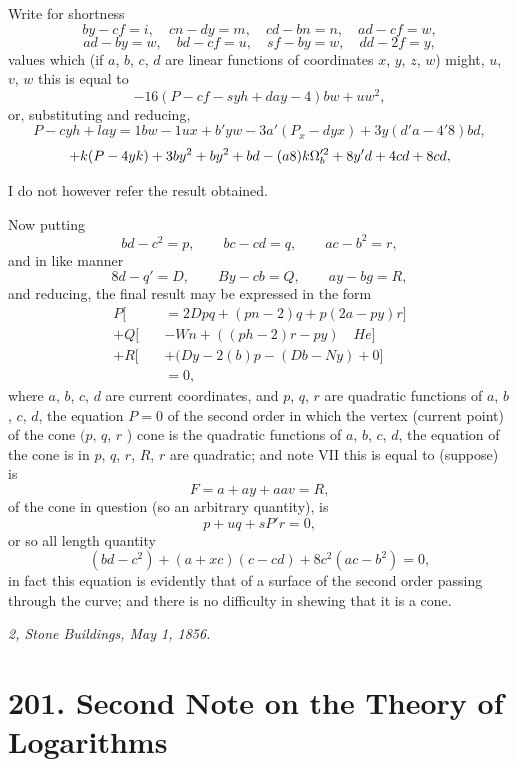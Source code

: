 \documentclass[12pt,a4paper]{article}
\theoremstyle{definition}
\begin{document}
Write for shortness
\[
by - cf = i, \quad cn - dy = m, \quad cd - bn = n, \quad ad - cf = w,
\]
\[
ad - by = w, \quad bd - cf = u, \quad sf - by = w, \quad dd - 2f = y,
\]
values which (if $a$, $b$, $c$, $d$ are linear functions of coordinates $x$, $y$, $z$, $w$) might, $u$, $v$, $w$
this is equal to
\[
-16(P - cf - syh + day - 4)bw + uw^2,
\]
or, substituting and reducing,
\[
P - cy h + lay = 1bw - 1ux + b'y w - 3a'(P_x - dy x) + 3y(d'a - 4'8) bd,
\]
\[
+ k(P - 4y k) + 3by^2 + by^2 + bd\\
- (a8) k\Omega_b'^2 + 8y'd + 4cd + 8cd,
\]

I do not however refer the result obtained.

\medskip

Now putting
\[
bd - c^2 = p,\qquad bc - cd = q,\qquad ac - b^2 = r,
\]
and in like manner
\[
8d - q' = D,\qquad By - cb = Q,\qquad ay - bg = R,
\]
and reducing, the final result may be expressed in the form
\begin{align*}
P[\quad &= 2Dpq + (pn - 2)q + p(2a - py)r]\\
+ Q[\quad &-Wn + ((ph - 2)r - py)\quad He]\\
+ R[\quad & + (Dy - 2(b)p - (Db - Ny) + 0]\\
&= 0,
\end{align*}
where $a$, $b$, $c$, $d$ are current coordinates, and $p$, $q$, $r$ are quadratic functions of $a$, $b$, $c$, $d$,
the equation $P = 0$ of the second order in which the vertex (current point) of the cone $(p$, $q$, $r$ ) cone is the quadratic functions of $a$, $b$, $c$, $d$,
the equation of the cone is in $p$, $q$, $r$, $R$, $r$ are quadratic; and note VII
this is equal to (suppose) is
\[
F = a + ay + a a v = R,
\]
of the cone in question (so an arbitrary quantity), is
\[
p + uq + sP'r = 0,
\]
or so all length quantity
\[
(bd - c^2) + (a + xc)(c - cd) + 8c^2(ac - b^2) = 0,
\]
in fact this equation is evidently that of a surface of the second order passing
through the curve; and there is no difficulty in shewing that it is a cone.

\bigskip

\noindent\textit{2, Stone Buildings, May 1, 1856.}

\newpage


\section*{201. Second Note on the Theory of Logarithms}
\end{document}
